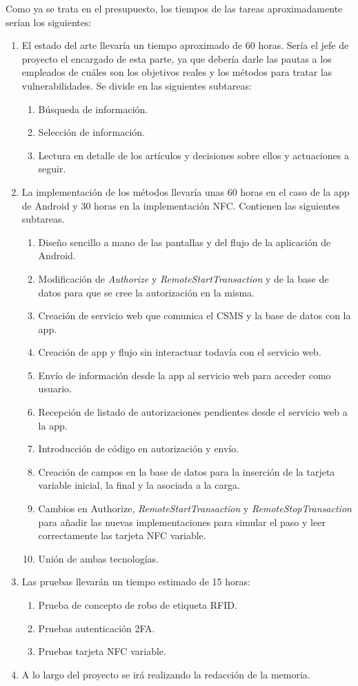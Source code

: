 \documentclass[12pt,a4paper,onecolumn,oneside]{report}
\begin{document}
Como ya se trata en el presupuesto, los tiempos de las tareas aproximadamente serían los siguientes:
\begin{enumerate}
\item El estado del arte llevaría un tiempo aproximado de 60 horas. Sería el jefe de proyecto el encargado de esta parte, ya que debería darle las pautas a los empleados de cuáles son los objetivos reales y los métodos para tratar las vulnerabilidades. Se divide en las siguientes subtareas:
\begin{enumerate}
\item Búsqueda de información.
\item Selección de información.
\item Lectura en detalle de los artículos y decisiones sobre ellos y actuaciones a seguir.
\end{enumerate}
\item La implementación de los métodos llevaría unas 60 horas en el caso de la app de Android y 30 horas en la implementación NFC. Contienen las siguientes subtareas.
\begin{enumerate}
\item Diseño sencillo a mano de las pantallas y del flujo de la aplicación de Android.
\item Modificación de \textit{Authorize} y \textit{RemoteStartTransaction} y de la base de datos para que se cree la autorización en la misma.
\item Creación de servicio web que comunica el CSMS y la base de datos con la app.
\item Creación de app y flujo sin interactuar todavía con el servicio web.
\item Envío de información desde la app al servicio web para acceder como usuario.
\item Recepción de listado de autorizaciones pendientes desde el servicio web a la app.
\item Introducción de código en autorización y envío.
\item Creación de campos en la base de datos para la inserción de la tarjeta variable inicial, la final y la asociada a la carga.
\item Cambios en Authorize, \textit{RemoteStartTransaction} y \textit{RemoteStopTransaction} para añadir las nuevas implementaciones para simular el paso y leer correctamente las tarjeta NFC variable.
\item Unión de ambas tecnologías.
\end{enumerate}
\item Las pruebas llevarán un tiempo estimado de 15 horas:
\begin{enumerate}
\item Prueba de concepto de robo de etiqueta RFID.
\item Pruebas autenticación 2FA.
\item Pruebas tarjeta NFC variable.
\end{enumerate}
\item A lo largo del proyecto se irá realizando la redacción de la memoria.
\end{enumerate}
\end{document}
